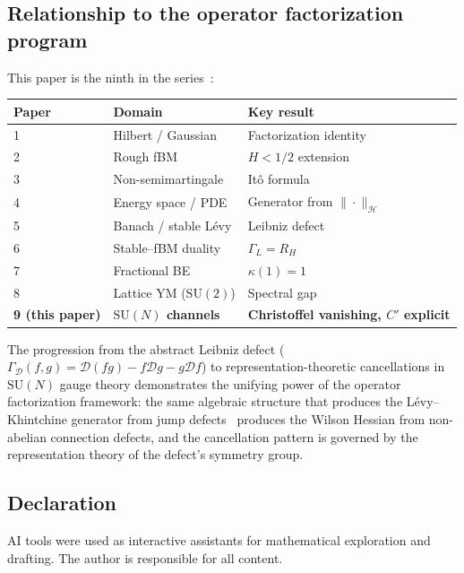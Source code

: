 \documentclass[11pt,a4paper]{article}
\theoremstyle{plain}
\theoremstyle{definition}
\theoremstyle{remark}
\newcommand{\SU}{\mathrm{SU}}
\newcommand{\cH}{\mathcal{H}}
\newcommand{\cD}{\mathcal{D}}
\begin{document}
\subsection{Relationship to the operator factorization program}

This paper is the ninth in the
series~\cite{Fontes2026a,Fontes2026b,Fontes2026c,Fontes2026i,Fontes2026d,Fontes2026e,Fontes2026f,Fontes2026Paper8}:

\begin{center}
\begin{tabular}{lll}
\toprule
Paper & Domain & Key result \\
\midrule
1~\cite{Fontes2026a} & Hilbert / Gaussian & Factorization identity \\
2~\cite{Fontes2026b} & Rough fBM & $H < 1/2$ extension \\
3~\cite{Fontes2026c} & Non-semimartingale & It\^o formula \\
4~\cite{Fontes2026i} & Energy space / PDE & Generator from $\|\cdot\|_{\cH}$ \\
5~\cite{Fontes2026d} & Banach / stable L\'evy & Leibniz defect \\
6~\cite{Fontes2026e} & Stable--fBM duality & $\Gamma_L = R_H$ \\
7~\cite{Fontes2026f} & Fractional BE & $\kappa(1)=1$ \\
8~\cite{Fontes2026Paper8} & Lattice YM ($\SU(2)$) & Spectral gap \\
\textbf{9 (this paper)} & \textbf{$\SU(N)$ channels}
& \textbf{Christoffel vanishing, $C'$ explicit} \\
\bottomrule
\end{tabular}
\end{center}

The progression from the abstract Leibniz defect
($\Gamma_{\cD}(f,g) = \cD(fg) - f\cD g - g\cD f$) to
representation-theoretic cancellations in $\SU(N)$ gauge theory
demonstrates the unifying power of the operator factorization
framework: the same algebraic structure that produces the
L\'evy--Khintchine generator from jump
defects~\cite{Fontes2026i,Fontes2026d} produces the Wilson
Hessian from non-abelian connection defects, and the cancellation
pattern is governed by the representation theory of the defect's
symmetry group.


\subsection*{Declaration}
AI tools were used as interactive assistants for mathematical
exploration and drafting. The author is responsible for all
content.
\end{document}
